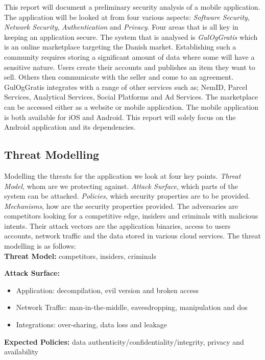 This report will document a preliminary security analysis of a mobile application. The application will be looked at from four various aspects: \textit{Software Security}, \textit{Network Security}, \textit{Authentication} and \textit{Privacy}. Four areas that is all key in keeping an application secure. The system that is analysed is \textit{GulOgGratis} which is an online marketplace targeting the Danish market. Establishing such a community requires storing a significant amount of data where some will have a sensitive nature. Users create their accounts and publishes an item they want to sell. Others then communicate with the seller and come to an agreement. GulOgGratis integrates with a range of other services such as; NemID, Parcel Services, Analytical Services, Social Platforms and Ad Services. The marketplace can be accessed either as a website or mobile application. The mobile application is both available for iOS and Android. This report will solely focus on the Android application and its dependencies.  

\subsection{Threat Modelling}
 Modelling the threats for the application we look at four key points. \textit{Threat Model},  whom are we protecting against. \textit{Attack Surface}, which parts of the system can be attacked. \textit{Policies}, which security properties are to be provided. \textit{Mechanisms}, how are the security properties provided. The adversaries are competitors looking for a competitive edge, insiders and criminals with malicious intents. Their attack vectors are the application binaries, access to users accounts, network traffic and the data stored in various cloud services. The threat modelling is as follows:\\       


\noindent\textbf{Threat Model:} competitors, insiders, criminals

\noindent\textbf{Attack Surface:}
\begin{itemize}
    \item Application: decompilation, evil version and broken access 
    \item Network Traffic: man-in-the-middle, eavesdropping, manipulation and dos
    \item Integrations: over-sharing, data loss and leakage
\end{itemize}

\noindent\textbf{Expected Policies:} data authenticity/confidentiality/integrity, privacy and availability 

